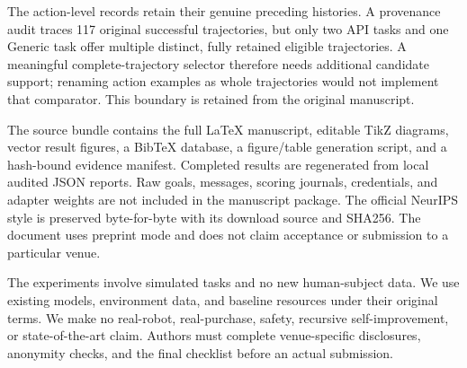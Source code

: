 The action-level records retain their genuine preceding histories. A provenance audit traces 117 original successful trajectories, but only two API tasks and one Generic task offer multiple distinct, fully retained eligible trajectories. A meaningful complete-trajectory selector therefore needs additional candidate support; renaming action examples as whole trajectories would not implement that comparator. This boundary is retained from the original manuscript.

The source bundle contains the full \LaTeX{} manuscript, editable TikZ diagrams, vector result figures, a BibTeX database, a figure/table generation script, and a hash-bound evidence manifest. Completed results are regenerated from local audited JSON reports. Raw goals, messages, scoring journals, credentials, and adapter weights are not included in the manuscript package. The official NeurIPS style is preserved byte-for-byte with its download source and SHA256. The document uses preprint mode and does not claim acceptance or submission to a particular venue.

The experiments involve simulated tasks and no new human-subject data. We use existing models, environment data, and baseline resources under their original terms. We make no real-robot, real-purchase, safety, recursive self-improvement, or state-of-the-art claim. Authors must complete venue-specific disclosures, anonymity checks, and the final checklist before an actual submission.
